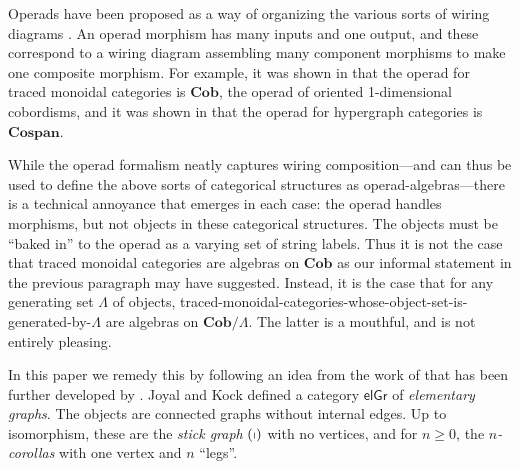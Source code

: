 \documentclass[11pt, article, oneside]{memoir}
\theoremstyle{plain}
\theoremstyle{definition}
\theoremstyle{remark}
\newcommand{\Cat}[1]{\mathbf{#1}}
\newcommand{\Cospan}{\Cat{Cospan}}
\newcommand{\Cob}{\Cat{Cob}}
\newcommand{\stodo}[2][]{\todo[color=red!30, #1]{#2}}
\newcommand\el{\mathsf{elGr}}
\begin{document}
Operads have been proposed as a way of organizing the various sorts of wiring diagrams \cite{Spivak:2013b,Rupel.Spivak:2013a}. An operad morphism has many inputs and one output, and these correspond to a wiring diagram assembling many component morphisms to make one composite morphism. For example, it was shown in \cite{Spivak.Schultz.Rupel:2016a} that the operad for traced monoidal categories is $\Cob$, the operad of oriented 1-dimensional cobordisms, and it was shown in \cite{Fong?} that the operad for hypergraph categories is $\Cospan$.

While the operad formalism neatly captures wiring composition---and can thus be used to define the above sorts of categorical structures as operad-algebras---there is a technical annoyance that emerges in each case: the operad handles morphisms, but not objects in these categorical structures. The objects must be ``baked in'' to the operad as a varying set of string labels. Thus it is not the case that traced monoidal categories are algebras on $\Cob$ as our informal statement in the previous paragraph may have suggested. Instead, it is the case that for any generating set $\Lambda$ of objects, traced-monoidal-categories-whose-object-set-is-generated-by-$\Lambda$ are algebras on $\Cob/\Lambda$. The latter is a mouthful, and is not entirely pleasing.


In this paper we remedy this by following an idea from the work of \cite{Joyal.Kock} that has been further developed by \cite{Raynor}. %
Joyal and Kock defined a category $\el$ of \emph{elementary graphs}. The objects are connected graphs without internal edges. Up to isomorphism, these are the \emph{stick graph} $(\shortmid)$ with no vertices, and for $n \geq 0$, the \emph{$n$-corollas} with one vertex and $n$ ``legs''.
\end{document}
